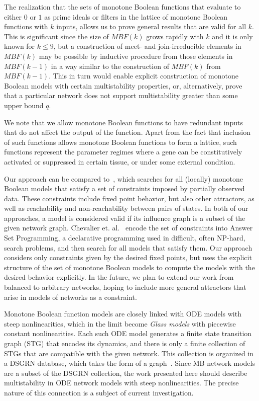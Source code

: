 \documentclass[10pt,letterpaper]{article}
\begin{document}
The realization that the sets of monotone Boolean functions that evaluate to either $0$ or $1$ as prime ideals or filters in the lattice of monotone Boolean functions with $k$ inputs, allows us to prove general results that are valid for all $k$. This is significant since the size of $MBF(k)$ grows rapidly with $k$ and it is only known for $k \leq 9$, but a construction of meet- and join-irreducible elements in $MBF(k)$ may be possible by inductive procedure from those elements in $MBF(k-1)$ in a way similar to the construction of $MBF(k)$ from $MBF(k-1)$\cite{gedeon_lattice_2024}. This in turn would enable explicit construction of monotone Boolean models with certain multistability properties, or, alternatively, prove that a particular network does not support multistability greater than some upper bound $q$. 

 We note that we allow monotone Boolean functions to have redundant inputs that do not affect the output of the function. Apart from the fact that inclusion of such functions allows monotone Boolean functions to form a lattice, such functions represent the parameter regimes where a gene can be constitutively activated or suppressed in certain tissue, or under some external condition.

Our approach can be compared to~\cite{chevalier_synthesis_2019}, which searches for all (locally) monotone Boolean models that satisfy a set of constraints imposed by partially observed data. These constraints include fixed point behavior, but also other attractors, as well as reachability and non-reachability between pairs of states. In both of our approaches, a model is considered valid if its influence graph is a subset of the given network graph. Chevalier et. al.~\cite{chevalier_synthesis_2019} encode the set of constraints into Answer Set Programming, a declarative programming used in difficult, often NP-hard, search problems, and then search for all models that satisfy them. Our approach considers only constraints given by the desired fixed points, but uses the explicit structure of the set of monotone Boolean models to compute the models with the desired behavior explicitly. In the future, we plan to extend our work from balanced to arbitrary networks, hoping to include more general attractors that arise in models of networks as a constraint.

Monotone Boolean function models are closely linked with ODE models with steep nonlinearities, which in the limit become \textit{Glass models} with piecewise constant nonlinearities. Each such ODE model generates a finite state transition graph (STG) that encodes its dynamics, and there is only a finite collection of STGs that are compatible with the given network. This collection is organized in a DSGRN database, which takes the form of a graph~\cite{cummins_combinatorial_2016,gedeon_multi-parameter_2020}. Since MB network models are a subset of the DSGRN collection, the work presented here should describe multistability in ODE network models with steep nonlinearities. The precise nature of this connection is a subject of current investigation. 
\end{document}
